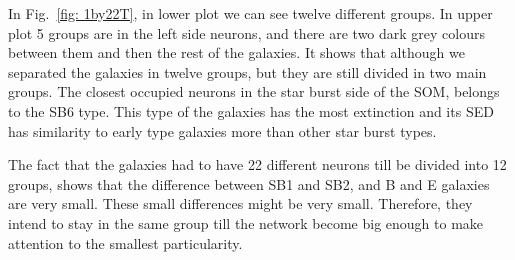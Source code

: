             In Fig.~\ref{fig: 1by22T}, in lower plot we can see twelve different groups. 
            In upper plot 5 groups are in the left side neurons, and there are two dark grey colours between them and then the rest of the galaxies. 
            It shows that although we separated the galaxies in twelve groups, but they are still divided in two main groups.
            The closest occupied neurons in the star burst side of the SOM, belongs to the SB6 type. 
            This type of the galaxies has the most extinction and its SED has similarity to early type galaxies more than other star burst types. 
            
            The fact that the galaxies had to have 22 different neurons till be divided into 12 groups, shows that the difference between SB1 and SB2, and B and E galaxies are very small.
            These small differences might be very small.
            Therefore, they intend to stay in the same group till the network become big enough to make attention to the smallest particularity.

